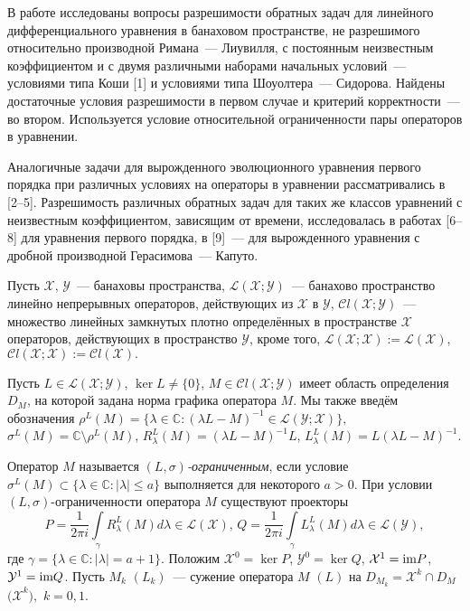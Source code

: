 


\vzmscaption

В работе исследованы вопросы  разрешимости обратных задач для линейного дифференциального уравнения в банаховом пространстве, не разрешимого относительно производной Римана~--- Лиувилля, с постоянным неизвестным коэффициентом и с двумя различными наборами начальных условий~--- условиями типа Коши [1] и условиями типа Шоуолтера~--- Сидорова. Найдены достаточные условия разрешимости в первом случае и критерий корректности~--- во втором. Используется условие относительной ограниченности пары операторов в уравнении.

Аналогичные задачи для вырожденного эволюционного уравнения первого порядка при различных условиях на операторы в уравнении рассматривались в [2--5]. Разрешимость различных обратных задач для таких же классов уравнений с неизвестным коэффициентом, зависящим от времени, исследовалась в работах [6--8] для уравнения первого порядка, в [9]~--- для вырожденного уравнения с дробной производной Герасимова~--- Капуто.

Пусть ${\mathcal  X}$, ${\mathcal  Y}$~--- банаховы пространства, ${\mathcal L}(\mathcal X; \mathcal Y)$~--- банахово пространство линейно непрерывных операторов, действующих из $\mathcal X$ в $\mathcal Y$,
${\mathcal C}l({ \mathcal X; \mathcal Y})$~--- множество линейных замкнутых плотно определённых в пространстве ${\mathcal X}$ операторов, действующих в пространство ${\mathcal Y}$, кроме того,
 ${\mathcal L}(\mathcal X; \mathcal X):={\mathcal L}(\mathcal X)$,  ${\mathcal C}l(\mathcal X;\mathcal X):={\mathcal C}l(\mathcal X).$

Пусть
$L\in{\mathcal  L}({\mathcal  X};{\mathcal  Y})$, $\ker L\ne\{0\}$, $M\in{\mathcal  C}l({\mathcal  X;\mathcal Y})$ имеет область определения $D_M$, на которой задана норма графика оператора $M$. Мы также введём обозначения $\rho^L(M)=\{\lambda\in\mathbb C:
(\lambda L-M)^{-1}\in{\mathcal  L(\mathcal Y;\mathcal X)}\},$ $\sigma^L(M)=\mathbb C\setminus\rho^L(M)$,  $R_\lambda^L(M)=(\lambda L-M)^{-1}L$, $L_\lambda^L(M)=L(\lambda L-M)^{-1}.$

Оператор $M$ называется {\it $(L,\sigma)$-ограниченным},
если условие $\sigma^L(M)\subset\{\lambda\in\mathbb  C:|\lambda|\leqslant a\}$ выполняется для некоторого $a>0$. При условии $(L,\sigma)$-ограниченности оператора $M$ существуют  проекторы
$$
P=\frac1{2\pi i}\int\limits_\gamma R_\lambda^L(M)d\lambda\in\mathcal L(\mathcal X),\, Q=\frac1{2\pi i}\int\limits_\gamma L_\lambda^L(M)d\lambda\in\mathcal L(\mathcal Y),
$$
где $\gamma=\{\lambda\in\mathbb C:|\lambda|=a+1\}$.
Положим ${\mathcal  X}^0 = \ker P$, ${\mathcal  Y}^0 = \ker Q$, ${\mathcal
X}^1 = \mbox{\rm im}P$, ${\mathcal  Y}^1 = \mbox{\rm im}Q$. Пусть $M_k$ $(L_k)$~--- сужение оператора $M$ $(L)$ на $D_{M_k}={\mathcal
X}^k \cap D_M$ ${(\mathcal X}^k),$ $k=0,1.$




